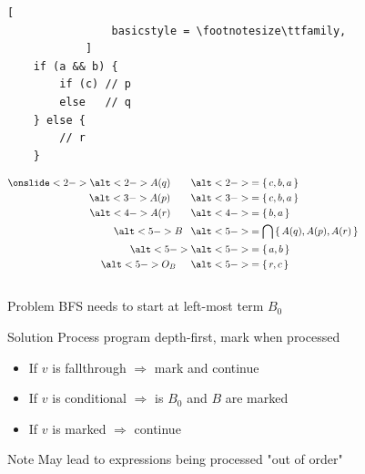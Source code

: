 \documentclass[xcolor = {dvipsnames, table}, aspectratio=169]{beamer}
\newcommand{\disponslide}[2]{%
    \alt<#1>{#2}{\phantom{#2}}
}
\begin{document}
\begin{frame}[fragile]
    \begin{columns}
        \begin{column}{0.5\textwidth}
            \begin{lstlisting}[
                basicstyle = \footnotesize\ttfamily,
            ]
    if (a && b) {
        if (c) // p
        else   // q
    } else {
        // r
    }
            \end{lstlisting}

            \begin{align*}
                    \onslide<2->
                    \disponslide{2-}{A(q)}  & \disponslide{2-}{= \set{c, b, a}} \\
                    \disponslide{3-}{A(p)}  & \disponslide{3-}{= \set{c, b, a}} \\
                    \disponslide{4-}{A(r)}  & \disponslide{4-}{= \set{b, a}   } \\
                    \disponslide{5-}{B}     & \disponslide{5-}{= \bigcap \set{A(q), A(p), A(r)}} \\
                    \disponslide{5-}{}      & \disponslide{5-}{= \set{a, b}} \\
                    \disponslide{5-}{O_B}   & \disponslide{5-}{= \set{r, c}} \\
            \end{align*}
        \end{column}

        \begin{column}{0.5\textwidth}
        \end{column}
        \setbeamercovered{}
    \end{columns}
\end{frame}

\begin{frame}
    \begin{block}{Problem}
        BFS needs to start at left-most term $B_0$
    \end{block}

    \begin{block}{Solution}
        Process program depth-first, mark when processed
    \end{block}

    \begin{itemize}
        \item If $v$ is fallthrough $\Rightarrow$ mark and continue
        \item If $v$ is conditional $\Rightarrow$ is $B_0$ and $B$ are marked
        \item If $v$ is marked $\Rightarrow$ continue
    \end{itemize}

    \begin{block}{Note}
        May lead to expressions being processed "out of order"
    \end{block}
\end{frame}
\end{document}
